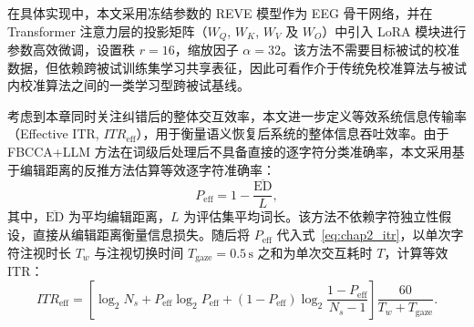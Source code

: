 
在具体实现中，本文采用冻结参数的 REVE 模型作为 EEG 骨干网络，并在 Transformer 注意力层的投影矩阵（$W_Q$, $W_K$, $W_V$ 及 $W_O$）中引入 LoRA 模块进行参数高效微调，设置秩 $r=16$，缩放因子 $\alpha=32$。该方法不需要目标被试的校准数据，但依赖跨被试训练集学习共享表征，因此可看作介于传统免校准算法与被试内校准算法之间的一类学习型跨被试基线。



考虑到本章同时关注纠错后的整体交互效率，本文进一步定义等效系统信息传输率（Effective ITR, $ITR_{\mathrm{eff}}$），用于衡量语义恢复后系统的整体信息吞吐效率。由于 FBCCA+LLM 方法在词级后处理后不具备直接的逐字符分类准确率，本文采用基于编辑距离的反推方法估算等效逐字符准确率：
\begin{equation}
P_{\mathrm{eff}}
=
1 - \frac{\overline{\mathrm{ED}}}{L},
\label{eq:chap2_p_eff}
\end{equation}
其中，$\overline{\mathrm{ED}}$ 为平均编辑距离，$L$ 为评估集平均词长。该方法不依赖字符独立性假设，直接从编辑距离衡量信息损失。随后将 $P_{\mathrm{eff}}$ 代入式~\eqref{eq:chap2_itr}，以单次字符注视时长 $T_w$ 与注视切换时间 $T_{\mathrm{gaze}}=0.5\,\mathrm{s}$ 之和为单次交互耗时 $T$，计算等效 ITR：
\begin{equation}
ITR_{\mathrm{eff}}
=
\left[
\log_2 N_s
+
P_{\mathrm{eff}} \log_2 P_{\mathrm{eff}}
+
(1-P_{\mathrm{eff}}) \log_2\frac{1-P_{\mathrm{eff}}}{N_s-1}
\right]
\frac{60}{T_w + T_{\mathrm{gaze}}}.
\label{eq:chap2_itr_eff_revised}
\end{equation}



